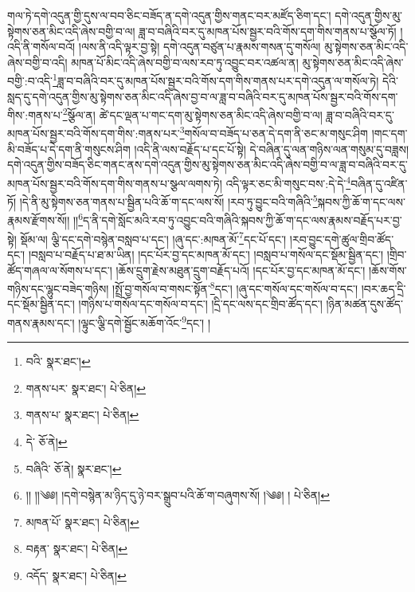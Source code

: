 གལ་ཏེ་དགེ་འདུན་གྱི་དུས་ལ་བབ་ཅིང་བཟོད་ན་དགེ་འདུན་གྱིས་གནང་བར་མཛོད་ཅིག་དང་། དགེ་འདུན་གྱིས་མུ་སྟེགས་ཅན་མིང་འདི་ཞེས་བགྱི་བ་ལ། ཟླ་བ་བཞིའི་བར་དུ་མཁན་པོས་སྦྱར་བའི་གོས་དག་གིས་གནས་པ་སྩོལ་ཏོ། །འདི་ནི་གསོལ་བའོ། །ལས་ནི་འདི་ལྟར་བྱ་སྟེ། དགེ་འདུན་བཙུན་པ་རྣམས་གསན་དུ་གསོལ། མུ་སྟེགས་ཅན་མིང་འདི་ཞེས་བགྱི་བ་འདི། མཁན་པོ་མིང་འདི་ཞེས་བགྱི་བ་ལས་རབ་ཏུ་འབྱུང་བར་འཚལ་ན། མུ་སྟེགས་ཅན་མིང་འདི་ཞེས་བགྱི་:བ་འདི་\footnote{བའི་  སྣར་ཐང་། }ཟླ་བ་བཞིའི་བར་དུ་མཁན་པོས་སྦྱར་བའི་གོས་དག་གིས་གནས་པར་དགེ་འདུན་ལ་གསོལ་ཏེ། དེའི་སླད་དུ་དགེ་འདུན་གྱིས་མུ་སྟེགས་ཅན་མིང་འདི་ཞེས་བྱ་བ་ལ་ཟླ་བ་བཞིའི་བར་དུ་མཁན་པོས་སྦྱར་བའི་གོས་དག་གིས་:གནས་པ་\footnote{གནས་པར་  སྣར་ཐང་།  པེ་ཅིན། }སྩོལ་ན། ཚེ་དང་ལྡན་པ་གང་དག་མུ་སྟེགས་ཅན་མིང་འདི་ཞེས་བགྱི་བ་ལ། ཟླ་བ་བཞིའི་བར་དུ་མཁན་པོས་སྦྱར་བའི་གོས་དག་གིས་:གནས་པར་\footnote{གནས་པ་  སྣར་ཐང་།  པེ་ཅིན། }གསོལ་བ་བཟོད་པ་ཅན་དེ་དག་ནི་ཅང་མ་གསུང་ཤིག །གང་དག་མི་བཟོད་པ་དེ་དག་ནི་གསུངས་ཤིག །འདི་ནི་ལས་བརྗོད་པ་དང་པོ་སྟེ། དེ་བཞིན་དུ་ལན་གཉིས་ལན་གསུམ་དུ་བཟླས། དགེ་འདུན་གྱིས་བཟོད་ཅིང་གནང་ནས་དགེ་འདུན་གྱིས་མུ་སྟེགས་ཅན་མིང་འདི་ཞེས་བགྱི་བ་ལ་ཟླ་བ་བཞིའི་བར་དུ་མཁན་པོས་སྦྱར་བའི་གོས་དག་གིས་གནས་པ་སྩལ་ལགས་ཏེ། འདི་ལྟར་ཅང་མི་གསུང་བས་:དེ་དེ་\footnote{དེ་  ཅོ་ནེ། }བཞིན་དུ་འཛིན་ཏོ། །དེ་ནི་མུ་སྟེགས་ཅན་གནས་པ་སྦྱིན་པའི་ཆོ་ག་དང་ལས་སོ། །རབ་ཏུ་བྱུང་བའི་གཞིའི་\footnote{བཞིའི་  ཅོ་ནེ།  སྣར་ཐང་། }སྐབས་ཀྱི་ཆོ་ག་དང་ལས་རྣམས་རྫོགས་སོ།། །།\footnote{།། །།༄༅། །དགེ་བསྙེན་མ་ཉིད་དུ་ཉེ་བར་སྒྲུབ་པའི་ཆོ་ག་བཞུགས་སོ། །༄༅། །  པེ་ཅིན། }ད་ནི་དགེ་སློང་མའི་རབ་ཏུ་འབྱུང་བའི་གཞིའི་སྐབས་ཀྱི་ཆོ་ག་དང་ལས་རྣམས་བརྗོད་པར་བྱ་སྟེ། སྡོམ་ལ། ལྕི་དང་དགེ་བསྙེན་བསླབ་པ་དང་། །ཞུ་དང་:མཁན་མོ་\footnote{མཁན་པོ་  སྣར་ཐང་།  པེ་ཅིན། }དང་པོ་དང་། །རབ་བྱུང་དགེ་ཚུལ་གྲིབ་ཚོད་དང་། །བསླབ་པ་བརྗོད་པ་ཐ་མ་ཡིན། །དང་པོར་བྱ་དང་མཁན་མོ་དང་། །བསླབ་པ་གསོལ་དང་སྡོམ་སྦྱིན་དང་། །གྲིབ་ཚོད་གཞལ་ལ་སོགས་པ་དང་། །ཆོས་དྲུག་རྗེས་མཐུན་དྲུག་བརྗོད་པའོ། །དང་པོར་བྱ་དང་མཁན་མོ་དང་། །ཆོས་གོས་གཉིས་དང་ལྷུང་བཟེད་གཉིས། །སྤྲོ་བྱ་གསོལ་བ་གསང་སྟོན་\footnote{བརྟན་  སྣར་ཐང་།  པེ་ཅིན། }དང་། །ཞུ་དང་གསོལ་དང་གསོལ་བ་དང་། །བར་ཆད་དྲི་དང་སྡོམ་སྦྱིན་དང་། །གཉིས་པ་གསོལ་དང་གསོལ་བ་དང་། །དྲི་དང་ལས་དང་གྲིབ་ཚོད་དང་། །ཉིན་མཚན་དུས་ཚོད་གནས་རྣམས་དང་། །ལྟུང་ལྕི་དགེ་སྦྱོང་མཆོག་འོང་\footnote{འདོད་  སྣར་ཐང་།  པེ་ཅིན། }དང་། །
